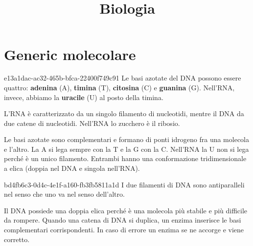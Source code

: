 \documentclass[preview]{standalone}
\begin{document}
\title{Biologia}
\genpage


\section{Generic molecolare}

\begin{snippet}{e13a1dac-ac32-465b-bfca-22400f749c91}
    Le basi azotate del DNA possono essere quattro:
    \textbf{adenina} (A),
    \textbf{timina} (T),
    \textbf{citosina} (C) e
    \textbf{guanina} (G).
    Nell'RNA, invece, abbiamo la \textbf{uracile} (U) al posto della timina.

    L'RNA è caratterizzato da un singolo filamento di nucleotidi,
    mentre il DNA da due catene di nucleotidi.
    Nell'RNA lo zucchero è il ribosio.


    Le basi azotate sono complementari e formano di ponti idrogeno
    fra una molecola e l'altro.
    La A si lega sempre con la T e la G con la C.
    Nell'RNA la U non si lega perché è un unico filamento.
    Entrambi hanno una conformazione tridimensionale a elica
    (doppia nel DNA e singola nell'RNA).
\end{snippet}


\begin{snippet}{bd4fb6c3-0d4c-4e1f-a160-fb3fb5811a1d}
    I due filamenti di DNA sono antiparalleli nel senso
    che uno va nel senso dell'altro.

    Il DNA possiede una doppia elica perché è una molecola
    più stabile e più difficile da rompere.
    Quando una catena di DNA si duplica, un enzima
    inserisce le basi complementari corrispondenti.
    In caso di errore un enzima se ne accorge e viene corretto.
\end{snippet}
\end{document}
